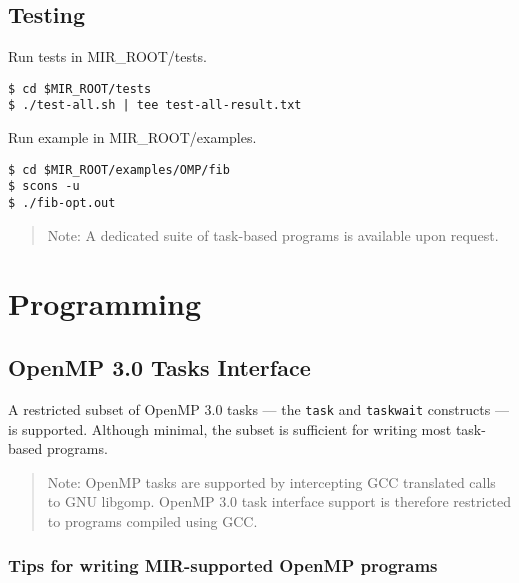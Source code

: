 \documentclass[11pt,a4paper]{article}
\begin{document}
\subsection{Testing}\label{testing}

Run tests in MIR\_ROOT/tests.

\begin{lstlisting}[style=MyInputStyle]
$ cd $MIR_ROOT/tests
$ ./test-all.sh | tee test-all-result.txt
\end{lstlisting}

Run example in MIR\_ROOT/examples.

\begin{lstlisting}[style=MyInputStyle]
$ cd $MIR_ROOT/examples/OMP/fib
$ scons -u
$ ./fib-opt.out
\end{lstlisting}

\begin{framed}
\begin{quote}
Note: A dedicated suite of task-based programs is available upon request.
\end{quote}
\end{framed}

\section{Programming}\label{programming}

\subsection{OpenMP 3.0 Tasks Interface}\label{openmp-3.0-tasks-interface}

A restricted subset of OpenMP 3.0 tasks --- the \texttt{task} and \texttt{taskwait} constructs --- is supported. Although minimal, the subset is sufficient for writing most task-based programs.

\begin{framed}
\begin{quote}
Note: OpenMP tasks are supported by intercepting GCC translated calls to GNU libgomp. OpenMP 3.0 task interface support is therefore restricted to programs compiled using GCC.
\end{quote}
\end{framed}

\subsubsection{Tips for writing MIR-supported OpenMP programs}\label{tips-for-writing-mir-supported-openmp-programs}
\end{document}

